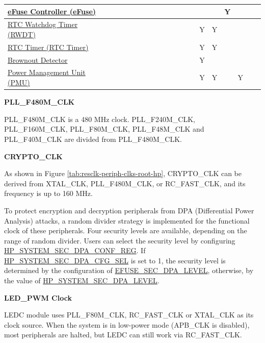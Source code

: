 \documentclass[main\_\_EN.tex]{subfiles}
\begin{document}
\begin{landscape}
\begin{tiny}
\begin{longtable}[c]{|m{2.1cm}|c|c|c|c|c|c|c|c|c|C{1.4cm}|c|c|c|c|c|c|c|c|c| }
    \hyperref[mod:efuse]{eFuse Controller (eFuse)} &  &  &  &  &  &  &  &  &  &  &    &  &  &  &  & Y &  &  \\ \hline
    \hyperref[mod:wdt]{RTC Watchdog Timer (RWDT)}  &  &  &  &  &  &  &  &  &  &  &   &  &  & Y & Y &  &  &  \\ \hline
    \hyperref[mod:lowpowm]{RTC Timer (RTC Timer)}  &  &  &  &  &  &  &  &  &  &  &    &  &  & Y & Y &  &  &  \\ \hline
    \hyperref[mod:lowpowm]{Brownout Detector} &  &  &  &  &  &  &  &  &  &  &  &  &    & Y &  &  &  &  \\ \hline
    \hyperref[mod:lowpowm]{Power Management Unit (PMU)} &  &  &  &  &  &  &  &  &  &    &  &  &  & Y & Y &  & Y &  \\ \hline
\end{longtable}
\end{tiny}

\end{landscape}


\textbf{PLL\_F480M\_CLK}

PLL\_F480M\_CLK is a 480 MHz clock. PLL\_F240M\_CLK, PLL\_F160M\_CLK, PLL\_F80M\_CLK, PLL\_F48M\_CLK and PLL\_F40M\_CLK are divided from PLL\_F480M\_CLK.

\textbf{CRYPTO\_CLK}

As shown in Figure \ref{tab:resclk-periph-clks-root-hp}, CRYPTO\_CLK can be derived from XTAL\_CLK, PLL\_F480M\_CLK, or RC\_FAST\_CLK, and its frequency is up to 160 MHz.


To protect encryption and decryption peripherals from DPA (Differential Power Analysis) attacks, a random divider strategy is implemented for the functional clock of these peripherals. Four security levels are available, depending on the range of random divider. Users can select the security level by configuring  \hyperref[regdesc:HPSYSTEMSECDPACONFREG]{HP\_SYSTEM\_SEC\_DPA\_CONF\_REG}. If  \hyperref[fielddesc:HPSYSTEMSECDPACFGSEL]{HP\_SYSTEM\_SEC\_DPA\_CFG\_SEL} is set to 1, the security level is determined by the configuration of \hyperref[fielddesc:EFUSESECDPALEVEL]{EFUSE\_SEC\_DPA\_LEVEL}, otherwise, by the value of  \hyperref[fielddesc:HPSYSTEMSECDPALEVEL]{HP\_SYSTEM\_SEC\_DPA\_LEVEL}.

\textbf{LED\_PWM Clock}

LEDC module uses PLL\_F80M\_CLK, RC\_FAST\_CLK or XTAL\_CLK as its clock source. When the system is in low-power mode (APB\_CLK is disabled), most peripherals are halted, but LEDC can still work via RC\_FAST\_CLK.
\end{document}
